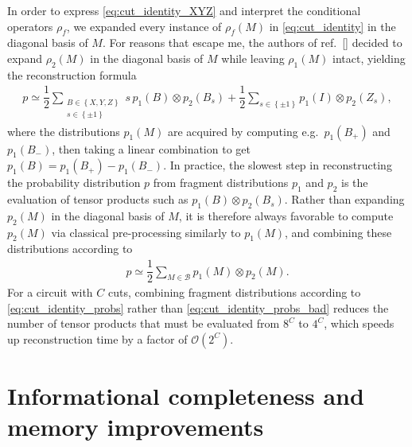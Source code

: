 \documentclass[nofootinbib,notitlepage,11pt]{revtex4-2}
\newcommand{\f}[2]{\dfrac{#1}{#2}} %
\newcommand{\p}[1]{\left(#1\right)} %
\renewcommand{\set}[1]{\left\{#1\right\}} %
\newcommand{\B}{\mathcal{B}}
\renewcommand{\O}{\mathcal{O}}
\begin{document}
In order to express \eqref{eq:cut_identity_XYZ} and interpret the
conditional operators $\rho_f$, we expanded every instance of
$\rho_f\p{M}$ in \eqref{eq:cut_identity} in the diagonal basis of $M$.
For reasons that escape me, the authors of
ref.~[] decided to expand $\rho_2\p{M}$ in
the diagonal basis of $M$ while leaving $\rho_1\p{M}$ intact, yielding
the reconstruction formula
\begin{align}
  p \simeq \f12 \sum_{\substack{B\in\set{X,Y,Z}\\s\in\set{\pm1}}}
  s\, p_1\p{B} \otimes p_2\p{B_s}
  + \f12\sum_{s\in\set{\pm1}} p_1\p{I} \otimes p_2\p{Z_s},
  \label{eq:cut_identity_probs_bad}
\end{align}
where the distributions $p_1\p{M}$ are acquired by computing
e.g.~$p_1\p{B_+}$ and $p_1\p{B_-}$, then taking a linear combination
to get $p_1\p{B}=p_1\p{B_+}-p_1\p{B_-}$.  In practice, the slowest
step in reconstructing the probability distribution $p$ from fragment
distributions $p_1$ and $p_2$ is the evaluation of tensor products
such as $p_1\p{B} \otimes p_2\p{B_s}$.  Rather than expanding
$p_2\p{M}$ in the diagonal basis of $M$, it is therefore always
favorable to compute $p_2\p{M}$ via classical pre-processing similarly
to $p_1\p{M}$, and combining these distributions according to
\begin{align}
  p \simeq \f12 \sum_{M\in\B} p_1\p{M} \otimes p_2\p{M}.
  \label{eq:cut_identity_probs}
\end{align}
For a circuit with $C$ cuts, combining fragment distributions
according to \eqref{eq:cut_identity_probs} rather than
\eqref{eq:cut_identity_probs_bad} reduces the number of tensor
products that must be evaluated from $8^C$ to $4^C$, which speeds up
reconstruction time by a factor of $\O\p{2^C}$.


\section{Informational completeness and memory improvements}
\label{sec:completeness}
\end{document}

